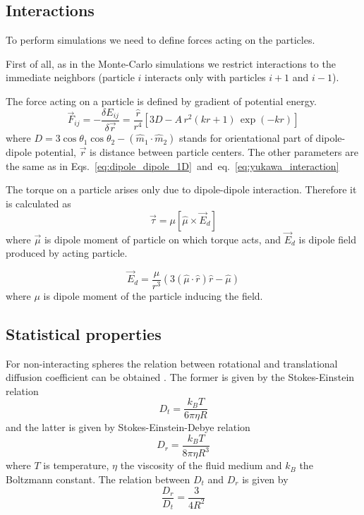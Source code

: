 \subsection{Interactions}

To perform simulations we need to define forces acting on the particles.

First of all, as in the Monte-Carlo simulations we restrict interactions to the immediate neighbors (particle $i$ interacts only with particles $i+1$ and $i-1$).

The force acting on a particle is defined by gradient of potential energy.
\begin{equation}
\label{eq:full_force}
	\vec{F}_{ij}
		= -\frac{\delta E_{ij}}{\delta \vec{r}}
		=  \frac{\hat{r}}{r^4} \left[3 D - A\, r^2 (k r +1) \, \exp(-k r) \right]
\end{equation}
where $D = 3 \cos \theta_1 \cos \theta_2 - (\hat{m}_1 \cdot \hat{m}_2)$ stands for orientational part of dipole-dipole potential, $\vec{r}$ is distance between particle centers. The other parameters are the same as in Eqs.~\eqref{eq:dipole_dipole_1D}~and~eq.~\eqref{eq:yukawa_interaction}

The torque on a particle arises only due to dipole-dipole interaction. Therefore it is calculated as
\begin{equation}
\label{eq:dipole_torque}
	\vec{\tau}  = \mu[\hat{\mu} \times \vec{E}_d ]
\end{equation}
where $\vec{\mu}$ is dipole moment of particle on which torque acts, and $\vec{E}_d$ is dipole field produced by acting particle.

\begin{equation}
\label{eq:dipole_field}
	\vec{E}_d = \frac{\mu}{r^3}
		\left(3 (\hat{\mu} \cdot \hat{r}) \hat{r} - \hat{\mu} \right)
\end{equation}
where $\mu$ is dipole moment of the particle inducing the field.

\subsection{Statistical properties}
For non-interacting spheres the relation between rotational and translational diffusion coefficient can be obtained \cite{C5SM02754C}. The former is given by the Stokes-Einstein relation
\begin{equation}
\label{eq:translational_diffusion_coefficient}
	D_t = \frac{k_B T}{6 \pi \eta R}
\end{equation}
and the latter is given by Stokes-Einstein-Debye relation
\begin{equation}
\label{eq:rotational_diffusion_coefficient}
	D_r = \frac{k_B T}{8 \pi \eta R^3}
\end{equation}
where $T$ is temperature, $\eta$ the viscosity of the fluid medium and $k_B$ the Boltzmann constant. The relation between $D_t$ and $D_r$ is given by
\begin{equation}
	\frac{D_r}{D_t} = \frac{3}{4 R^2}
\end{equation}

